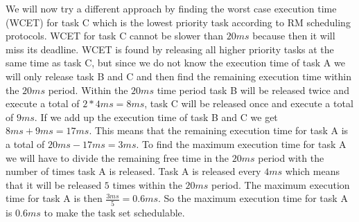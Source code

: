     We will now try a different approach by finding the worst case execution time (WCET) for task C which is the lowest priority task according to RM scheduling protocols. WCET for task C cannot be slower than $20ms$ because then it will miss its deadline. WCET is found by releasing all higher priority tasks at the same time as task C, but since we do not know the execution time of task A we will only release task B and C and then find the remaining execution time within the $20ms$ period. Within the $20ms$ time period task B will be released twice and execute a total of $2*4ms = 8ms$, task C will be released once and execute a total of $9ms$. If we add up the execution time of task B and C we get $8ms + 9ms = 17ms$. This means that the remaining execution time for task A is a total of $20ms - 17ms = 3ms$. To find the maximum execution time for task A we will have to divide the remaining free time in the $20ms$ period with the number of times task A is released. Task A is released every $4ms$ which means that it will be released $5$ times within the $20ms$ period. The maximum execution time for task A is then $\frac{3ms}{5} = 0.6ms$. So the maximum execution time for task A is $0.6ms$ to make the task set schedulable.

    

